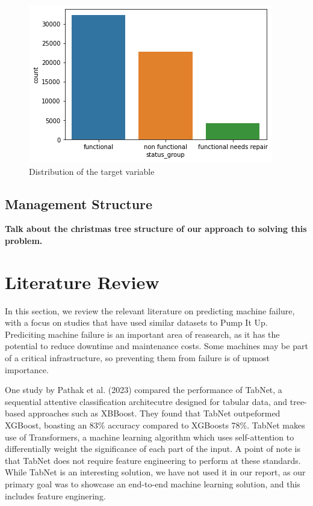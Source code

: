 \documentclass[conference]{IEEEtran}
\begin{document}
\begin{figure}[h]
    \centering
    \includegraphics[scale=0.5]{figures/status_groups.png}
    \caption{Distribution of the target variable}
    \label{fig:status_groups}
\end{figure}

\subsection{Management Structure}

\textbf{Talk about the christmas tree structure of our approach to solving this problem.}

\section{Literature Review}

In this section, we review the relevant literature on predicting machine failure, with a focus on studies that have used similar datasets to Pump It Up. Prediciting machine failure is an important area of reasearch, as it has the potential to reduce downtime and maintenance costs. Some machines may be part of a critical infrastructure, so preventing them from failure is of upmost importance.

One study by Pathak et al. (2023) \cite{pathak2023pump} compared the performance of TabNet, a sequential attentive classification architecutre designed for tabular data, and tree-based approaches such as XBBoost. They found that TabNet outpeformed XGBoost, boasting an 83\% accuracy compared to XGBoosts 78\%. TabNet makes use of Transformers, a machine learning algorithm which uses self-attention to differentially weight the significance of each part of the input. A point of note is that TabNet does not require feature engineering to perform at these standards. While TabNet is an interesting solution, we have not used it in our report, as our primary goal was to showcase an end-to-end machine learning solution, and this includes feature enginering.
\end{document}
